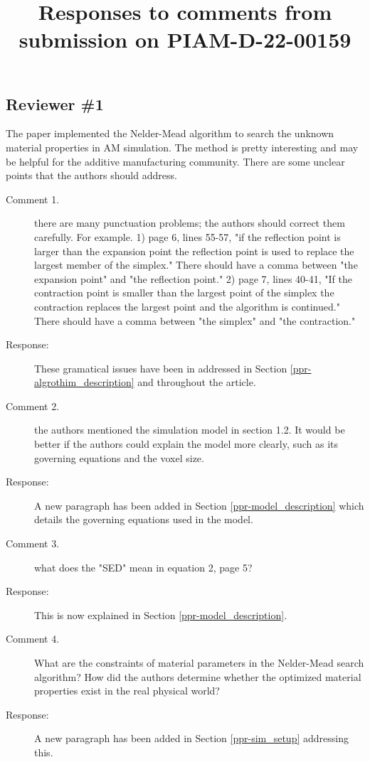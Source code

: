 \documentclass{article}
\begin{document}
\title{Responses to comments from submission on PIAM-D-22-00159}
\date{}

\maketitle

\subsection*{Reviewer \#1} The paper implemented the Nelder-Mead algorithm to search the unknown material properties in AM simulation. The method is pretty interesting and may be helpful for the additive manufacturing community. There are some unclear points that the authors should address.
\begin{description}
	\item[Comment 1.] there are many punctuation problems; the authors should correct them carefully. For example. 1) page 6, lines 55-57, "if the reflection point is larger than the expansion point the reflection point is used to replace the largest member of the simplex." There should have a comma between "the expansion point" and "the reflection point." 2) page 7, lines 40-41, "If the contraction point is smaller than the largest point of the simplex the contraction replaces the largest point and the algorithm is continued." There should have a comma between "the simplex" and "the contraction."
 	\item[Response:] These gramatical issues have been in addressed in Section \ref{ppr-algrothim_description} and throughout the article.
 	\item[Comment 2.] the authors mentioned the simulation model in section 1.2. It would be better if the authors could explain the model more clearly, such as its governing equations and the voxel size.
 	\item[Response:] A new paragraph has been added in Section \ref{ppr-model_description} which details the governing equations used in the model.
 	\item[Comment 3.] what does the "SED" mean in equation 2, page 5?
 	\item[Response:] This is now explained in Section \ref{ppr-model_description}.
 	\item[Comment 4.] What are the constraints of material parameters in the Nelder-Mead search algorithm? How did the authors determine whether the optimized material properties exist in the real physical world?
 	\item[Response:] A new paragraph has been added in Section \ref{ppr-sim_setup} addressing this.

\end{description}
\end{document}
